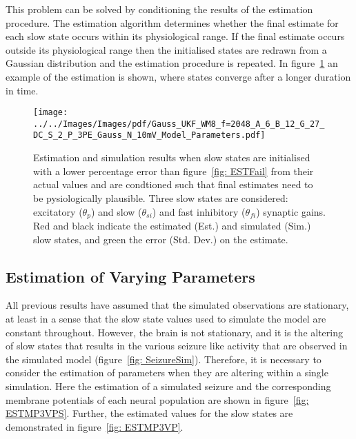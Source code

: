 This problem can be solved by conditioning the results of the estimation procedure. The estimation algorithm determines whether the final estimate for each slow state occurs within its physiological range. If the final estimate occurs outside its physiological range then the initialised states are redrawn from a Gaussian distribution and the estimation procedure is repeated. In figure~\ref{fig: EstInitPass} an example of the estimation is shown, where states converge after a longer duration in time.
\begin{figure}%
	\centering
		\texttt{[image: ../../Images/Images/pdf/Gauss\_UKF\_WM8\_f=2048\_A\_6\_B\_12\_G\_27\_DC\_S\_2\_P\_3PE\_Gauss\_N\_10mV\_Model\_Parameters.pdf]}
	\caption{Estimation and simulation results when slow states are initialised with a lower percentage error than figure~\ref{fig: ESTFail} from their actual values and are condtioned such that final estimates need to be pysiologically plausible. Three slow states are considered: excitatory ($\theta_{p}$) and slow ($\theta_{si}$) and fast inhibitory ($\theta_{fi}$) synaptic gains. Red and black indicate the estimated (Est.) and simulated (Sim.) slow states, and green the error (Std. Dev.) on the estimate.}
	\label{fig: EstInitPass}
\end{figure}%

\subsection{Estimation of Varying Parameters}

All previous results have assumed that the simulated observations are stationary, at least in a sense that the slow state values used to simulate the model are constant throughout. However, the brain is not stationary, and it is the altering of slow states that results in the various seizure like activity that are observed in the simulated model (figure~\ref{fig: SeizureSim}). Therefore, it is necessary to consider the estimation of parameters when they are altering within a single simulation. Here the estimation of a simulated seizure and the corresponding membrane potentials of each neural population are shown in figure~\ref{fig: ESTMP3VPS}. Further, the estimated values for the slow states are demonstrated in figure~\ref{fig: ESTMP3VP}.

